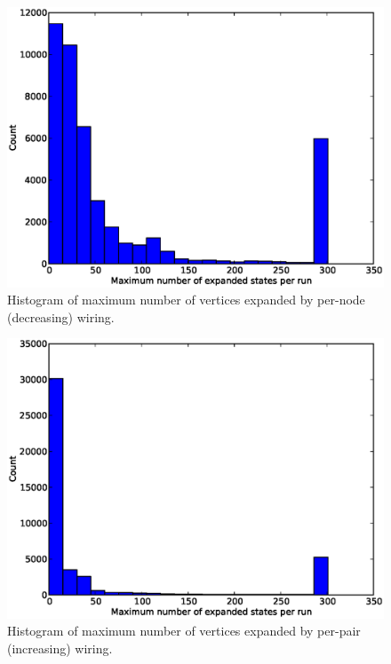 \begin{figure}[H]
\begin{center}
\includegraphics[width=\textwidth]{Images/max_expanded_per_node_decreasing.eps}
\caption[Number of vertices expanded by per-node (decreasing)]{Histogram of
maximum number of vertices expanded by per-node (decreasing) wiring.}
\label{fig:max_expanded_per_node_decreasing}
\end{center}
\end{figure}

\begin{figure}[H]
\begin{center}
\includegraphics[width=\textwidth]{Images/max_expanded_per_pair_increasing.eps}
\caption[Number of vertices expanded by per-pair (increasing)]{Histogram of
maximum number of vertices expanded by per-pair (increasing) wiring.}
\label{fig:max_expanded_per_pair_increasing}
\end{center}
\end{figure}

